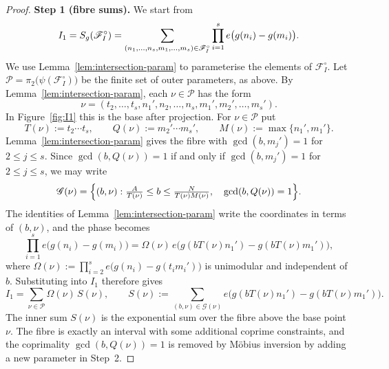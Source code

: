 \begin{proof}
\smallskip\noindent\textbf{Step 1 (fibre sums).}
We start from
\[
I_1=S_g\!\left(\mathscr{F}_I^\circ\right)
=\sum_{(n_1,\ldots,n_s,m_1,\ldots,m_s)\in\mathscr{F}_I^\circ}
\prod_{i=1}^s e\bigl(g(n_i)-g(m_i)\bigr).
\]
We use Lemma~\ref{lem:intersection-param} to parameterise the elements of $\mathscr{F}_I^\circ$.
Let $\mathscr P=\pi_2\bigl(\psi(\mathscr{F}_I^\circ)\bigr)$ be the finite set of outer parameters, as above. By Lemma~\ref{lem:intersection-param}, each $\nu\in\mathscr P$ has the form
\[
\nu=(t_2,\ldots,t_s,n_1',n_2,\ldots,n_s,m_1',m_2',\ldots,m_s').
\]
In Figure~\ref{fig:I1} this is the base after projection.
For $\nu\in\mathscr P$ put
\[
T(\nu):=t_2\cdots t_s,\qquad
Q(\nu):=m_2'\cdots m_s',\qquad
M(\nu):=\max\{n_1',m_1'\}.
\]
Lemma~\ref{lem:intersection-param}
gives the fibre with \(\gcd(b,m_j')=1\) for \(2\leq j\leq s\). Since \(\gcd(b,Q(\nu))=1\) if and only if \(\gcd(b,m_j')=1\) for \(2\leq j\leq s\), we may write
\[
\mathscr G(\nu)
=\Bigl\{(b,\nu):
\tfrac{A}{T(\nu)}\leq b\leq\tfrac{N}{T(\nu)M(\nu)},\quad
\gcd(b,Q(\nu))=1\Bigr\}.
\]
The identities of Lemma~\ref{lem:intersection-param} write the coordinates in terms of \((b,\nu)\), and the phase becomes
\[
\prod_{i=1}^s e\bigl(g(n_i)-g(m_i)\bigr)
=\Omega(\nu)\,e\bigl(g(bT(\nu)n_1')-g(bT(\nu)m_1')\bigr),
\]
where \(\Omega(\nu):=\prod_{i=2}^s e\bigl(g(n_i)-g(t_im_i')\bigr)\)
is unimodular and independent of $b$.
Substituting into \(I_1\) therefore gives
\begin{equation}\label{eq:I1-outer-decomposition}
I_1
=\sum_{\nu\in\mathscr P}\Omega(\nu)\,S(\nu),
\qquad
S(\nu)
:=\sum_{(b,\nu)\in\mathscr G(\nu)}
e\bigl(g(bT(\nu)n_1')-g(bT(\nu)m_1')\bigr).
\end{equation}
The inner sum $S(\nu)$ is the exponential sum over the fibre above the base point $\nu$.
The fibre is exactly an interval with some additional coprime constraints, and the coprimality
$\gcd(b,Q(\nu))=1$ is removed by M\"obius inversion by adding a new parameter in Step~2.


\end{proof}
